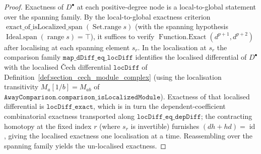 \begin{proof}
  \leanok
  Exactness of \(D^\bullet\) at each positive-degree node is a local-to-global
  statement over the spanning family. By the local-to-global exactness criterion
  \(\operatorname{exact\_of\_isLocalized\_span}(\operatorname{Set.range} s)\) (with the
  spanning hypothesis \(\operatorname{Ideal.span}(\operatorname{range} s) = \top\)), it
  suffices to verify \(\operatorname{Function.Exact}(d^{p+1}, d^{p+2})\) after
  localising at each spanning element \(s_r\). In the localisation at \(s_r\) the
  comparison family \(\mathtt{map\_dDiff\_eq\_locDiff}\) identifies the localised
  differential of \(D^\bullet\) with the localised Čech differential \(\mathtt{locDiff}\)
  of Definition~\ref{def:section_cech_module_complex} (using the localisation
  transitivity \(M_a[1/b] = M_{ab}\) of
  \(\mathtt{AwayComparison.comparison\_isLocalizedModule}\)). Exactness of that
  localised differential is \(\mathtt{locDiff\_exact}\), which is in turn the
  dependent-coefficient combinatorial exactness transported along
  \(\mathtt{locDiff\_eq\_depDiff}\); the contracting homotopy at the fixed index
  \(r\) (where \(s_r\) is invertible) furnishes \((dh + hd) = \operatorname{id}\),
  giving the localised exactness one localisation at a time. Reassembling over the
  spanning family yields the un-localised exactness.
\end{proof}

